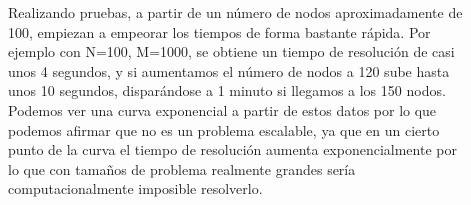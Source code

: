 \documentclass{article}
\begin{document}
\begin{description}
  \item[\begin{tabular}{p{15cm}}{En base a los resultados obtenidos, ¿diría que este problema es escalable, es decir, se puede abordar su
    resolución en grafos de un tamaño considerable? Razone su respuesta.}\end{tabular}]
    Realizando pruebas, a partir de un número de nodos aproximadamente de 100, empiezan a empeorar los tiempos de forma bastante rápida.
    Por ejemplo con N=100, M=1000, se obtiene un tiempo de resolución de casi unos 4 segundos, y si aumentamos el número de nodos a 120 sube hasta 
    unos 10 segundos, disparándose a 1 minuto si llegamos a  los 150 nodos.
    Podemos ver una curva exponencial a partir de estos datos por lo que podemos afirmar que no es un problema escalable, ya que 
    en un cierto punto de la curva el tiempo de resolución aumenta exponencialmente por lo que con tamaños de problema realmente grandes 
    sería computacionalmente imposible resolverlo.
\end{description}
\end{document}
